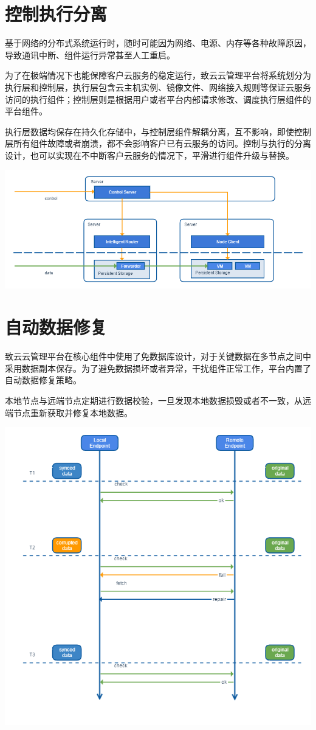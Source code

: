 \documentclass[letterpaper,10pt]{sphinxmanual}
\begin{document}
\section{控制执行分离}
\label{index:id20}
基于网络的分布式系统运行时，随时可能因为网络、电源、内存等各种故障原因，导致通讯中断、组件运行异常甚至人工重启。

为了在极端情况下也能保障客户云服务的稳定运行，致云云管理平台将系统划分为执行层和控制层，执行层包含云主机实例、镜像文件、网络接入规则等保证云服务访问的执行组件；控制层则是根据用户或者平台内部请求修改、调度执行层组件的平台组件。

执行层数据均保存在持久化存储中，与控制层组件解耦分离，互不影响，即使控制层所有组件故障或者崩溃，都不会影响客户已有云服务的访问。控制与执行的分离设计，也可以实现在不中断客户云服务的情况下，平滑进行组件升级与替换。

\includegraphics{4_3_service_robust.png}


\section{自动数据修复}
\label{index:id21}
致云云管理平台在核心组件中使用了免数据库设计，对于关键数据在多节点之间中采用数据副本保存。为了避免数据损坏或者异常，干扰组件正常工作，平台内置了自动数据修复策略。

本地节点与远端节点定期进行数据校验，一旦发现本地数据损毁或者不一致，从远端节点重新获取并修复本地数据。

\includegraphics{4_4_data_repair.png}
\end{document}
